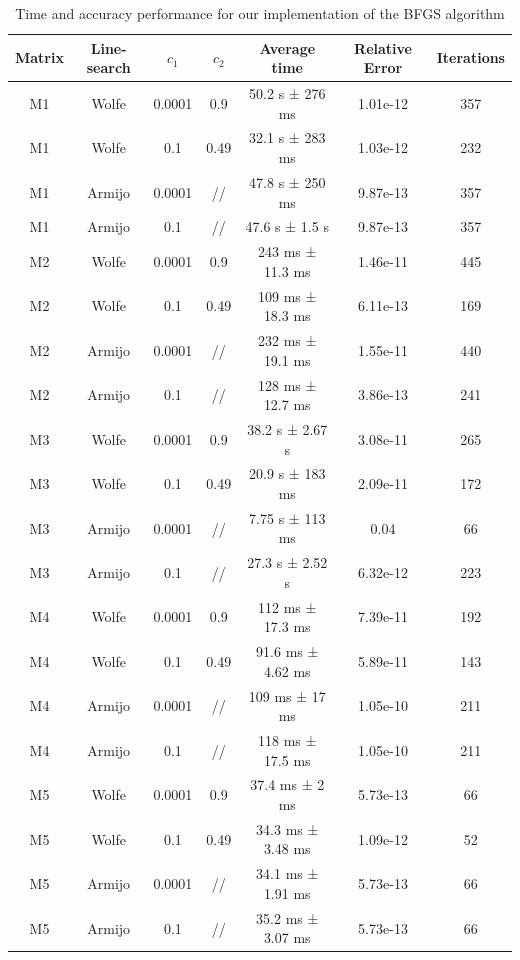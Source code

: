 \documentclass{article}
\numberwithin{equation}{section}
\begin{document}
\begin{table}[H]
    \centering
    \begin{tabular}{||c c c c c c c||}
 \hline
 Matrix & Line-search & $c_1$ & $c_2$ & Average time & Relative Error & Iterations \\ [0.8ex] 
 \hline\hline
 M1 & Wolfe & 0.0001 & 0.9 & 50.2 s ± 276 ms & 1.01e-12 & 357 \\ 
 \hline
 M1 & Wolfe & 0.1 & 0.49 & 32.1 s ± 283 ms & 1.03e-12 & 232 \\ 
 \hline
 M1 & Armijo & 0.0001 & // & 47.8 s ± 250 ms & 9.87e-13 & 357 \\ 
 \hline
 M1 & Armijo & 0.1 & // & 47.6 s ± 1.5 s & 9.87e-13 & 357 \\ 
 \hline
 M2 & Wolfe & 0.0001 & 0.9 & 243 ms ± 11.3 ms & 1.46e-11 & 445 \\ 
 \hline
 M2 & Wolfe & 0.1 & 0.49 & 109 ms ± 18.3 ms & 6.11e-13 & 169 \\ 
 \hline
 M2 & Armijo & 0.0001 & // & 232 ms ± 19.1 ms & 1.55e-11 & 440 \\ 
 \hline
 M2 & Armijo & 0.1 & // & 128 ms ± 12.7 ms & 3.86e-13 & 241 \\ 
 \hline
 M3 & Wolfe & 0.0001 & 0.9 & 38.2 s ± 2.67 s & 3.08e-11 & 265 \\ 
 \hline
 M3 & Wolfe & 0.1 & 0.49 & 20.9 s ± 183 ms & 2.09e-11 & 172 \\ 
 \hline
 M3 & Armijo & 0.0001 & // & 7.75 s ± 113 ms & 0.04 & 66 \\ 
 \hline
 M3 & Armijo & 0.1 & // & 27.3 s ± 2.52 s & 6.32e-12 & 223 \\ 
 \hline
 M4 & Wolfe & 0.0001 & 0.9 & 112 ms ± 17.3 ms & 7.39e-11 & 192 \\ 
 \hline
 M4 & Wolfe & 0.1 & 0.49 & 91.6 ms ± 4.62 ms & 5.89e-11 & 143 \\ 
 \hline
 M4 & Armijo & 0.0001 & // & 109 ms ± 17 ms & 1.05e-10 & 211 \\ 
 \hline
 M4 & Armijo & 0.1 & // & 118 ms ± 17.5 ms & 1.05e-10 & 211 \\ 
 \hline
 M5 & Wolfe & 0.0001 & 0.9 & 37.4 ms ± 2 ms & 5.73e-13 & 66 \\ 
 \hline
 M5 & Wolfe & 0.1 & 0.49 & 34.3 ms ± 3.48 ms & 1.09e-12 & 52 \\ 
 \hline
 M5 & Armijo & 0.0001 & // & 34.1 ms ± 1.91 ms & 5.73e-13 & 66 \\ 
 \hline
 M5 & Armijo & 0.1 & // & 35.2 ms ± 3.07 ms & 5.73e-13 & 66 \\
 \hline
 \end{tabular}
    \caption{Time and accuracy performance for our implementation of the BFGS algorithm}
    \label{tab:performance_BFGS}
\end{table}
\end{document}

